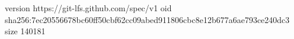 version https://git-lfs.github.com/spec/v1
oid sha256:7ec20556678bc60ff50cbf62cc09abed911806cbc8e12b677a6ae793ce240dc3
size 140181
